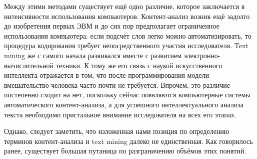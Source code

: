 Между этими методами существует ещё одно различие, которое заключается в интенсивности использования компьютеров. Контент-анализ возник ещё задолго до изобретения первых ЭВМ и до сих пор предполагает ограниченное использования компьютера: если подсчёт слов легко можно автоматизировать, то процедура кодирования требует непосредственного участия исследователя. Text mining же с самого начала развивался вместе с развитием электронно-вычислительной техники. К тому же его связь с наукой искусственного интеллекта отражается в том, что после программирования модели вмешательство человека часто почти не требуется. Впрочем, это различие постепенно сходит на нет, поскольку сейчас появляются компьютерные системы автоматического контент-анализа, а для успешного интеллектуального анализа текста необходимо пристальное внимание исследователя на всех его этапах.

Однако, следует заметить, что изложенная нами позиция по определению терминов контент-анализа и text mining далеко не единственная. Как говорилось ранее, существует большая путаница по разграничению объёмов этих понятий. 
\clearpage